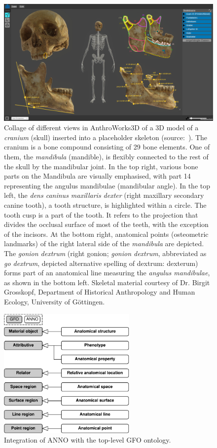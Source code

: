 \documentclass[sw]{iosart2x}
\newcommand{\aw}{AnthroWorks3D}
\begin{document}
\begin{figure}[h]
\includegraphics[width=\textwidth]{img/aw3d.png}
\caption{
Collage of different views in \aw{} of a 3D model of a \emph{cranium} (skull) inserted into a placeholder skeleton (source:~\cite{aw3dcidoc}).
The cranium is a bone compound consisting of 29 bone elements.
One of them, the \emph{mandibula} (mandible), is flexibly connected to the rest of the skull by the mandibular joint.
In the top right, various bone parts on the Mandibula are visually emphasised, with part 14 representing the angulus mandibulae (mandibular angle).
In the top left, the \emph{dens caninus maxillaris dexter} (right maxillary secondary canine tooth), a tooth structure, is highlighted within a circle.
The tooth cusp is a part of the tooth.
It refers to the projection that divides the occlusal surface of most of the teeth, with the exception of the incisors.
At the bottom right, anatomical points (osteometric landmarks) of the right lateral side of the \emph{mandibula} are depicted.
The \emph{gonion dextrum} (right gonion; \emph{gonion dextrum}, abbreviated as \emph{go dextrum}, depicted alternative spelling of dextrum: dexterum) forms part of an anatomical line measuring the \emph{angulus mandibulae},
as shown in the bottom left.
Skeletal material courtesy of Dr. Birgit Grosskopf, Department of Historical Anthropology and Human Ecology, University of Göttingen.
}
\label{fig:aw3d}
\end{figure}

\begin{figure}[h]
\includegraphics[width=0.6\textwidth]{img/gfo.pdf}
\caption{Integration of ANNO with the top-level GFO ontology.}\label{fig:gfo}
\end{figure}
\end{document}
